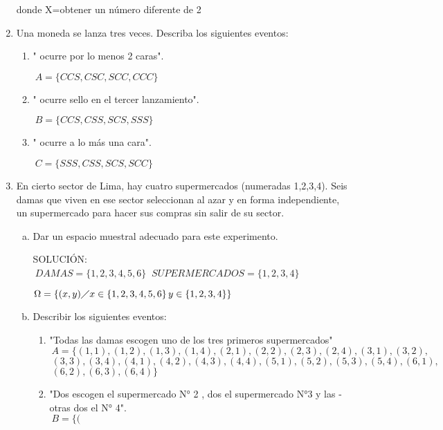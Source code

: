 \documentclass[13pt,a4paper]{article}
\begin{document}
\begin{enumerate}
 donde  X=obtener un número diferente de 2 


\item Una moneda se lanza tres veces. Describa los siguientes eventos:

\begin{enumerate}[A: ]

\item " ocurre por lo menos 2 caras".

$\ A=\lbrace CCS,CSC,SCC,CCC\rbrace$

\item " ocurre sello en el tercer lanzamiento".

$\ B=\lbrace CCS,CSS,SCS,SSS\rbrace$

\item " ocurre a lo más una cara".

$\ C=\lbrace SSS,CSS,SCS,SCC\rbrace$

\end{enumerate}

\item En cierto sector de Lima, hay cuatro supermercados (numeradas 1,2,3,4).
Seis damas que viven en ese sector seleccionan al azar y en forma independiente, un supermercado para hacer sus compras sin salir de su sector. 

\begin{enumerate}[a) ]

\item Dar un espacio muestral adecuado para este experimento.

SOLUCIÓN:\\[0.2cm]
$\ DAMAS=\lbrace1,2,3,4,5,6\rbrace$    $\ SUPERMERCADOS=\lbrace1,2,3,4\rbrace$

$\Omega=\lbrace (x,y) \diagup x \in \lbrace1,2,3,4,5,6\rbrace   \,  y \in \lbrace1,2,3,4\rbrace \rbrace $

\item  Describir los siguientes eventos:

\begin{enumerate}[A: ]

\item "Todas las damas escogen uno de los tres primeros supermercados" \\[0.2cm]
$\ A=\lbrace (1,1),(1,2),(1,3),(1,4),(2,1),(2,2),(2,3),(2,4),(3,1),(3,2),$
$\ (3,3),(3,4),(4,1),(4,2),(4,3),(4,4),(5,1),(5,2),(5,3),(5,4),(6,1),$
$\ (6,2),(6,3),(6,4)\rbrace$

\item "Dos escogen el supermercado N° 2 , dos el supermercado N°3 y las -
otras dos el N° 4".\\[0.2cm]
$\ B=\lbrace (           $                             




\end{enumerate}
\end{enumerate}
\end{enumerate}
\end{document}
